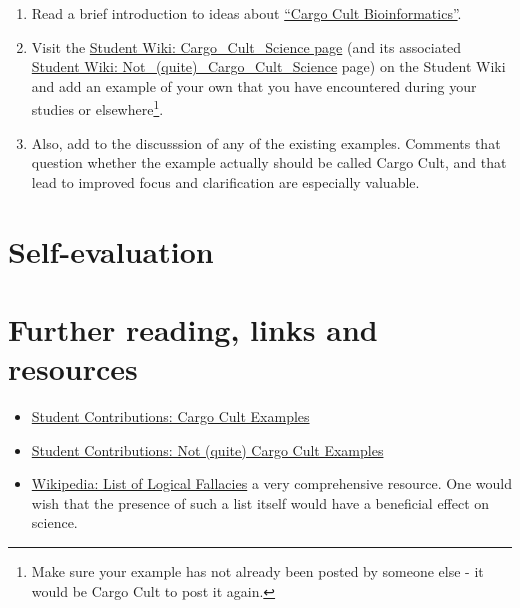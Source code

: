 \documentclass[]{book}
\providecommand{\tightlist}{%
  \setlength{\itemsep}{0pt}\setlength{\parskip}{0pt}}
\let\rmarkdownfootnote\footnote%
\def\footnote{\protect\rmarkdownfootnote}
\begin{document}
\begin{rmd-task}
\begin{enumerate}
\def\labelenumi{\arabic{enumi}.}
\tightlist
\item
  Read a brief introduction to ideas about
  \href{./boris_docs/FND-Cargo_Cult.pdf}{``Cargo Cult Bioinformatics''}.
\item
  Visit the
  \href{http://steipe.biochemistry.utoronto.ca/abc/students/index.php/Cargo_Cult_Science}{Student
  Wiki: Cargo\_Cult\_Science page} (and its associated
  \href{http://steipe.biochemistry.utoronto.ca/abc/students/index.php/Not_(quite)_Cargo_Cult_Science}{Student
  Wiki: Not\_(quite)\_Cargo\_Cult\_Science} page) on the Student Wiki
  and add an example of your own that you have encountered during your
  studies or elsewhere\footnote{Make sure your example has not already
    been posted by someone else - it would be Cargo Cult to post it
    again.}.
\item
  Also, add to the discusssion of any of the existing examples. Comments
  that question whether the example actually should be called Cargo
  Cult, and that lead to improved focus and clarification are especially
  valuable.
\end{enumerate}
\end{rmd-task}

\section{Self-evaluation}\label{self-evaluation-3}

\section{Further reading, links and
resources}\label{further-reading-links-and-resources-5}

\begin{itemize}
\tightlist
\item
  \href{http://steipe.biochemistry.utoronto.ca/abc/students/index.php/Cargo_Cult_Science}{Student
  Contributions: Cargo Cult Examples}
\item
  \href{http://steipe.biochemistry.utoronto.ca/abc/students/index.php/Not_(quite)_Cargo_Cult_Science}{Student
  Contributions: Not (quite) Cargo Cult Examples}
\item
  \href{https://en.wikipedia.org/wiki/List_of_fallacies}{Wikipedia: List
  of Logical Fallacies} a very comprehensive resource. One would wish
  that the presence of such a list itself would have a beneficial effect
  on science.
\end{itemize}
\end{document}
